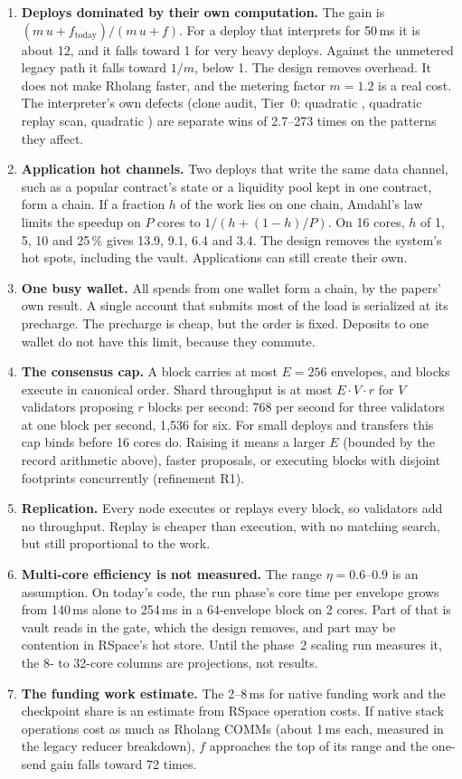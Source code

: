 \documentclass[11pt]{article}
\newcommand{\code}{\path}
\begin{document}
\begin{enumerate}
\item \textbf{Deploys dominated by their own computation.} The gain is $(m\,u + f_{\mathrm{today}})/(m\,u + f)$. For a deploy that interprets for 50\,ms it is about 12, and it falls toward 1 for very heavy deploys. Against the unmetered legacy path it falls toward $1/m$, below 1. The design removes overhead. It does not make Rholang faster, and the metering factor $m = 1.2$ is a real cost. The interpreter's own defects (clone audit, Tier~0: quadratic \code{Env::put}, quadratic replay scan, quadratic \code{eval_match}) are separate wins of 2.7--273 times on the patterns they affect.
\item \textbf{Application hot channels.} Two deploys that write the same data channel, such as a popular contract's state or a liquidity pool kept in one contract, form a chain. If a fraction $h$ of the work lies on one chain, Amdahl's law limits the speedup on $P$ cores to $1/(h + (1-h)/P)$. On 16 cores, $h$ of 1, 5, 10 and 25\,\% gives 13.9, 9.1, 6.4 and 3.4. The design removes the system's hot spots, including the vault. Applications can still create their own.
\item \textbf{One busy wallet.} All spends from one wallet form a chain, by the papers' own result. A single account that submits most of the load is serialized at its precharge. The precharge is cheap, but the order is fixed. Deposits to one wallet do not have this limit, because they commute.
\item \textbf{The consensus cap.} A block carries at most $E = 256$ envelopes, and blocks execute in canonical order. Shard throughput is at most $E \cdot V \cdot r$ for $V$ validators proposing $r$ blocks per second: 768 per second for three validators at one block per second, 1{,}536 for six. For small deploys and transfers this cap binds before 16 cores do. Raising it means a larger $E$ (bounded by the record arithmetic above), faster proposals, or executing blocks with disjoint footprints concurrently (refinement R1).
\item \textbf{Replication.} Every node executes or replays every block, so validators add no throughput. Replay is cheaper than execution, with no matching search, but still proportional to the work.
\item \textbf{Multi-core efficiency is not measured.} The range $\eta = 0.6$--$0.9$ is an assumption. On today's code, the run phase's core time per envelope grows from 140\,ms alone to 254\,ms in a 64-envelope block on 2 cores. Part of that is vault reads in the gate, which the design removes, and part may be contention in RSpace's hot store. Until the phase~2 scaling run measures it, the 8- to 32-core columns are projections, not results.
\item \textbf{The funding work estimate.} The 2--8\,ms for native funding work and the checkpoint share is an estimate from RSpace operation costs. If native stack operations cost as much as Rholang COMMs (about 1\,ms each, measured in the legacy reducer breakdown), $f$ approaches the top of its range and the one-send gain falls toward 72 times.
\end{enumerate}
\end{document}
